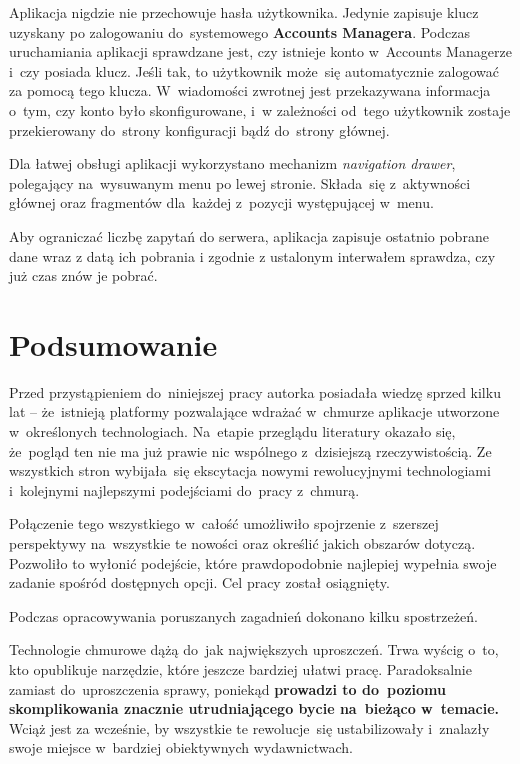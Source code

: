 \documentclass[12pt,a4paper,twoside,titlepage,openright]{book}
\begin{document}
Aplikacja nigdzie nie przechowuje hasła użytkownika. Jedynie zapisuje klucz uzyskany po zalogowaniu do~systemowego \textbf{Accounts Managera}. Podczas uruchamiania aplikacji sprawdzane jest, czy istnieje konto w~Accounts Managerze i~czy posiada klucz. Jeśli tak, to użytkownik może~się automatycznie zalogować za pomocą tego klucza. W~wiadomości zwrotnej jest przekazywana informacja o~tym, czy konto było skonfigurowane, i~w zależności od~tego użytkownik zostaje przekierowany do~strony konfiguracji bądź do~strony głównej.

Dla łatwej obsługi aplikacji wykorzystano mechanizm \textit{navigation drawer}, polegający na~wysuwanym menu po lewej stronie. Składa~się z~aktywności głównej oraz fragmentów dla~każdej z~pozycji występującej w~menu.

Aby ograniczać liczbę zapytań do serwera, aplikacja zapisuje ostatnio pobrane dane wraz z datą ich pobrania i zgodnie z ustalonym interwałem sprawdza, czy już czas znów je pobrać.


\chapter*{Podsumowanie}
 
Przed przystąpieniem do~niniejszej pracy autorka posiadała wiedzę sprzed kilku lat -- że~istnieją platformy pozwalające wdrażać w~chmurze aplikacje utworzone w~określonych technologiach. Na~etapie przeglądu literatury okazało się, że~pogląd ten nie ma już prawie nic wspólnego z~dzisiejszą rzeczywistością. Ze wszystkich stron wybijała~się ekscytacja nowymi rewolucyjnymi technologiami i~kolejnymi najlepszymi podejściami do~pracy z~chmurą. 

Połączenie tego wszystkiego w~całość umożliwiło spojrzenie z~szerszej perspektywy na~wszystkie te nowości oraz określić jakich obszarów dotyczą. Pozwoliło to wyłonić podejście, które prawdopodobnie najlepiej wypełnia swoje zadanie spośród dostępnych opcji. Cel pracy został osiągnięty.

Podczas opracowywania poruszanych zagadnień dokonano kilku spostrzeżeń.

Technologie chmurowe dążą do~jak największych uproszczeń. Trwa wyścig o~to, kto opublikuje narzędzie, które jeszcze bardziej ułatwi pracę. Paradoksalnie zamiast do~uproszczenia sprawy, poniekąd \textbf{prowadzi to do~poziomu skomplikowania znacznie utrudniającego bycie na~bieżąco w~temacie.} Wciąż jest za wcześnie, by wszystkie te rewolucje~się ustabilizowały i~znalazły swoje miejsce w~bardziej obiektywnych wydawnictwach. 
\end{document}

